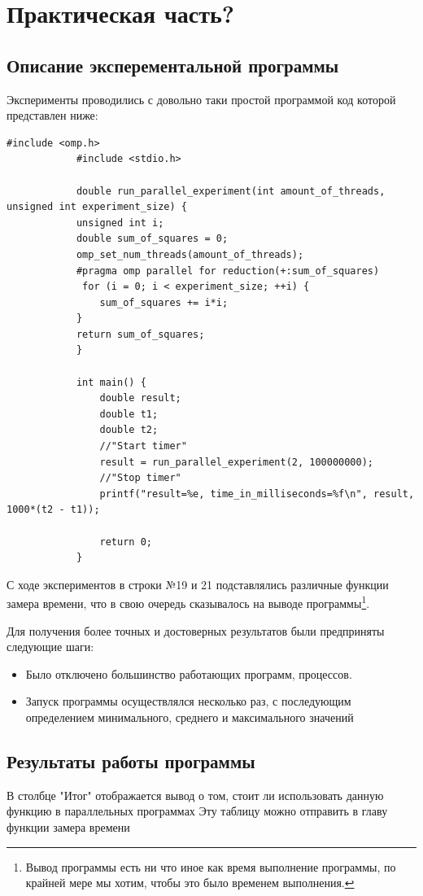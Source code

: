 \documentclass{article}
\begin{document}
	\section{Практическая часть?}
		\subsection{Описание эксперементальной программы}
			Эксперименты проводились с довольно таки простой программой код которой представлен ниже:
			
			\begin{lstlisting}[label=some-code,caption=Тестовая программа]
			#include <omp.h>
			#include <stdio.h>
			
			double run_parallel_experiment(int amount_of_threads, unsigned int experiment_size) {
    		unsigned int i;
    		double sum_of_squares = 0;
    		omp_set_num_threads(amount_of_threads); 
    		#pragma omp parallel for reduction(+:sum_of_squares)
   			 for (i = 0; i < experiment_size; ++i) {
        		sum_of_squares += i*i;
    		}
   			return sum_of_squares;
			}

			int main() {
    			double result;
    			double t1;
    			double t2;
				//"Start timer"
    			result = run_parallel_experiment(2, 100000000);
				//"Stop timer"
    			printf("result=%e, time_in_milliseconds=%f\n", result, 1000*(t2 - t1));
    
    			return 0;
			}
		\end{lstlisting}
		\newpage
		
			С ходе экспериментов в строки №19 и 21 подставлялись различные функции замера времени, что в свою очередь сказывалось 		на выводе программы\footnote{Вывод программы есть ни что иное как время выполнение программы, по крайней мере мы 					хотим, чтобы это было временем выполнения.}.
			
			Для получения более точных и достоверных результатов были предприняты следующие шаги:
			
			\begin{itemize}
				\item Было отключено большинство работающих программ, процессов.
				\item Запуск программы осуществлялся несколько раз, с последующим определением минимального, среднего и 								максимального значений 
			\end{itemize}			
		
			
		\subsection{Результаты работы программы}
		В столбце "Итог" отображается вывод о том, стоит ли использовать данную функцию в параллельных программах
		Эту таблицу можно отправить в главу функции замера времени
		
\end{document}
